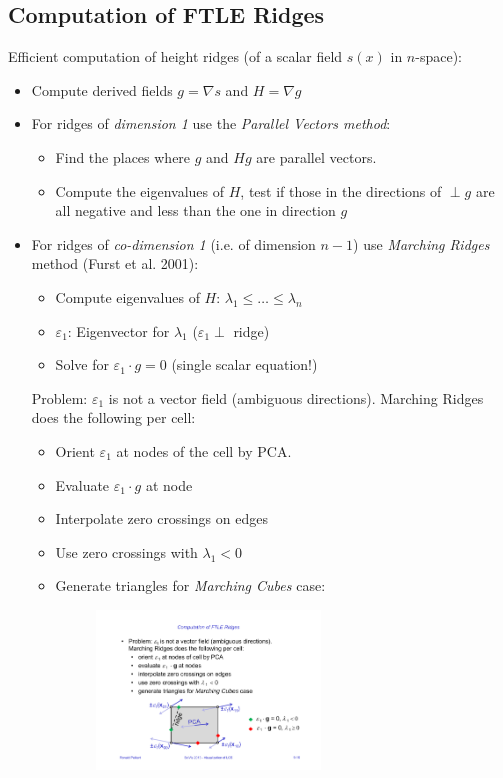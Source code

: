 \subsection{Computation of FTLE Ridges}
Efficient computation of height ridges (of a scalar field $s(x)$ in $n$-space):
\begin{itemize}
\item Compute derived fields $g=\nabla s$ and $H=\nabla g$
\item For ridges of \emph{dimension 1} use the \emph{Parallel Vectors method}:
    \begin{itemize}
        \item Find the places where $g$ and $Hg$ are parallel vectors.
        \item Compute the eigenvalues of $H$, test if those in the directions of $\perp g$ are all negative and less than the one in direction $g$
    \end{itemize}
\item For ridges of \emph{co-dimension 1} (i.e. of dimension $n-1$) use \emph{Marching Ridges} method (Furst et al. 2001):
    \begin{itemize}
        \item Compute eigenvalues of $H$: $\lambda_1 \leq \ldots \leq \lambda_n$
        \item $\varepsilon_1$: Eigenvector for $\lambda_1$ ($\varepsilon_1 \perp $ ridge)
        \item Solve for $\varepsilon_1 \cdot g=0$ (single scalar equation!)
    \end{itemize}

    Problem: $\varepsilon_1$ is not a vector field (ambiguous directions). Marching Ridges does the following per cell:
    
    \begin{itemize}
        \item Orient $\varepsilon_1$ at nodes of the cell by PCA.
        \item Evaluate $\varepsilon_1\cdot g$ at node
        \item Interpolate zero crossings on edges
        \item Use zero crossings with $\lambda_1 < 0$
        \item Generate triangles for \emph{Marching Cubes} case:
            \begin{figure}[H]
                \centering
                \includegraphics[width=0.6\textwidth]{img/09_ftle_ridges}
            \end{figure}

    \end{itemize}
\end{itemize}


